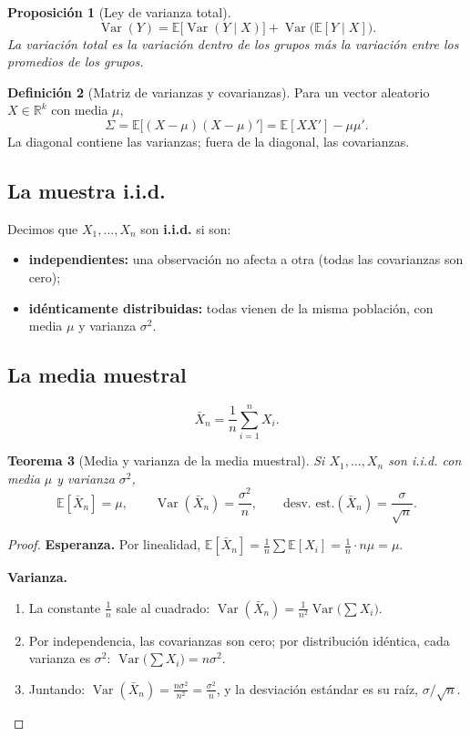 \documentclass[11pt,a4paper]{article}
\theoremstyle{plain}
\newtheorem{teorema}{Teorema}[section]
\newtheorem{proposicion}[teorema]{Proposición}
\theoremstyle{definition}
\newtheorem{definicion}[teorema]{Definición}
\theoremstyle{remark}
\newcommand{\E}{\mathbb{E}}
\newcommand{\R}{\mathbb{R}}
\DeclareMathOperator{\Var}{Var}
\begin{document}
\begin{proposicion}[Ley de varianza total]\label{prop:vartotal}
\[
\Var(Y)=\E\big[\Var(Y\mid X)\big]+\Var\big(\E[Y\mid X]\big).
\]
La variación total es la variación \emph{dentro} de los grupos más la variación \emph{entre}
los promedios de los grupos.
\end{proposicion}

\begin{definicion}[Matriz de varianzas y covarianzas]\label{def:sigma}
Para un vector aleatorio $X\in\R^k$ con media $\mu$,
\[
\Sigma=\E\big[(X-\mu)(X-\mu)'\big]=\E[XX']-\mu\mu'.
\]
La diagonal contiene las varianzas; fuera de la diagonal, las covarianzas.
\end{definicion}

\subsection{La muestra i.i.d.}

Decimos que $X_1,\dots,X_n$ son \textbf{i.i.d.} si son:
\begin{itemize}
  \item \textbf{independientes:} una observación no afecta a otra (todas las covarianzas son cero);
  \item \textbf{idénticamente distribuidas:} todas vienen de la misma población, con media $\mu$
        y varianza $\sigma^2$.
\end{itemize}

\subsection{La media muestral}\label{sec:media}

\[
\bar X_n=\frac1n\sum_{i=1}^n X_i .
\]

\begin{teorema}[Media y varianza de la media muestral]\label{teo:mediamuestral}
Si $X_1,\dots,X_n$ son i.i.d. con media $\mu$ y varianza $\sigma^2$,
\[
\E[\bar X_n]=\mu,\qquad \Var(\bar X_n)=\frac{\sigma^2}{n},\qquad
\text{desv. est.}(\bar X_n)=\frac{\sigma}{\sqrt n}.
\]
\end{teorema}
\begin{proof}
\textbf{Esperanza.} Por linealidad,
$\E[\bar X_n]=\frac1n\sum\E[X_i]=\frac1n\cdot n\mu=\mu$.

\textbf{Varianza.}
\begin{enumerate}
  \item La constante $\tfrac1n$ sale al cuadrado:
        $\Var(\bar X_n)=\frac1{n^2}\Var\big(\sum X_i\big)$.
  \item Por independencia, las covarianzas son cero; por distribución idéntica, cada varianza
        es $\sigma^2$: $\Var\big(\sum X_i\big)=n\sigma^2$.
  \item Juntando: $\Var(\bar X_n)=\frac{n\sigma^2}{n^2}=\frac{\sigma^2}{n}$, y la desviación
        estándar es su raíz, $\sigma/\sqrt n$.
\end{enumerate}
\end{proof}
\end{document}
